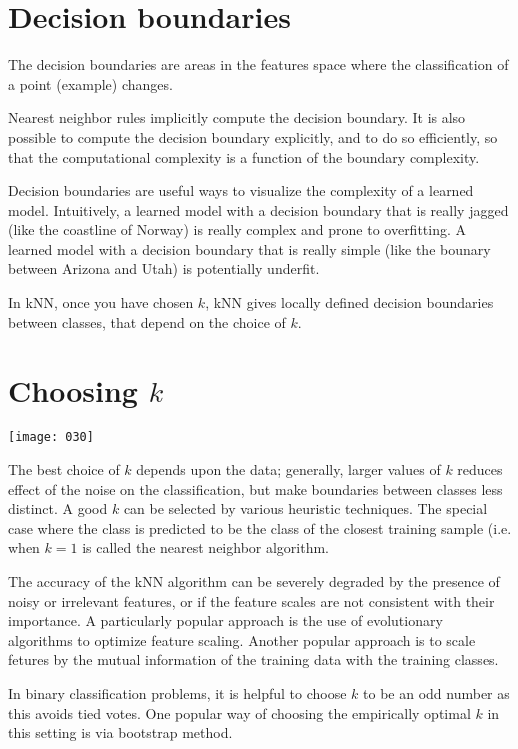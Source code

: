 \section{Decision boundaries}
The decision boundaries are areas in the features space where the classification of a point (example) changes.

Nearest neighbor rules implicitly compute the decision boundary. It is also possible to compute the decision boundary explicitly, and to do so efficiently, so that the computational complexity is a function of the boundary complexity.

Decision boundaries are useful ways to visualize the complexity of a learned model. Intuitively, a learned model with a decision boundary that is really jagged (like the coastline of Norway) is really complex and prone to overfitting. A learned model with a decision boundary that is really simple (like the bounary between Arizona and Utah) is potentially underfit.

In kNN, once you have chosen \(k\), kNN gives locally defined decision boundaries between classes, that depend on the choice of \(k\).

\section{Choosing \(k\)}

\begin{center}
    \texttt{[image: 030]}
    \label{fig:030}
\end{center}

The best choice of \(k\) depends upon the data; generally, larger values of \(k\) reduces effect of the noise on the classification, but make boundaries between classes less distinct. A good \(k\) can be selected by various heuristic techniques. The special case where the class is predicted to be the class of the closest training sample (i.e. when \(k=1\) is called the nearest neighbor algorithm.

The accuracy of the kNN algorithm can be severely degraded by the presence of noisy or irrelevant features, or if the feature scales are not consistent with their importance. A particularly popular approach is the use of evolutionary algorithms to optimize feature scaling. Another popular approach is to scale fetures by the mutual information of the training data with the training classes. 

In binary classification problems, it is helpful to choose \(k\) to be an odd number as this avoids tied votes. One popular way of choosing the empirically optimal \(k\) in this setting is via bootstrap method.

